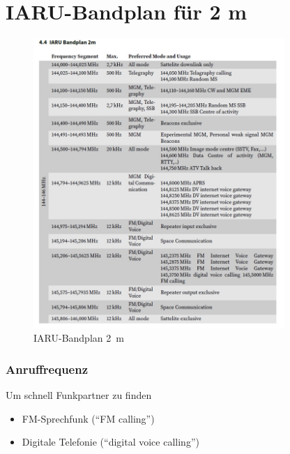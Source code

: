 
\section{IARU-Bandplan für 2 m}
\label{section:iaru_bandplan_2m}
\begin{frame}%

\begin{figure}
    \includegraphics[width=0.85\textwidth]{foto/102}
    \caption{\scriptsize IARU-Bandplan \qty{2}{\metre}}
    \label{n_iaru_bandplan_2m}
\end{figure}

\end{frame}

\begin{frame}
\frametitle{Anruffrequenz}
Um schnell Funkpartner zu finden

\begin{itemize}
  \item FM-Sprechfunk (\enquote{FM calling})
  \item Digitale Telefonie (\enquote{digital voice calling})
  \end{itemize}

\end{frame}

